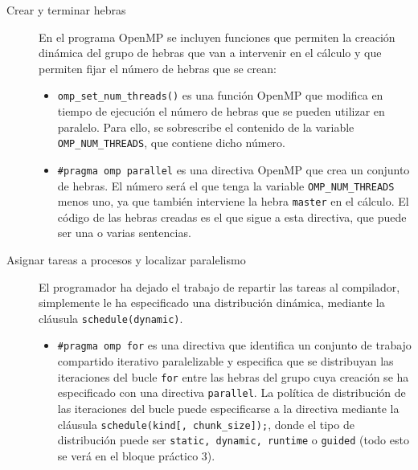 \begin{description}
    \item [Crear y terminar hebras] En el programa OpenMP se incluyen funciones que permiten la creación dinámica del grupo de hebras que van a intervenir en el cálculo y que permiten fijar el número de hebras que se crean:
        \begin{itemize}
            \item \verb|omp_set_num_threads()| es una función OpenMP que modifica en tiempo de ejecución el número de hebras que se pueden utilizar en paralelo. Para ello, se sobrescribe el contenido de la variable \verb|OMP_NUM_THREADS|, que contiene dicho número.
            \item \verb|#pragma omp parallel| es una directiva OpenMP que crea un conjunto de hebras. El número será el que tenga la variable \verb|OMP_NUM_THREADS| menos uno, ya que también interviene la hebra \verb|master| en el cálculo. El código de las hebras creadas es el que sigue a esta directiva, que puede ser una o varias sentencias.
        \end{itemize}
    \item [Asignar tareas a procesos y localizar paralelismo] El programador ha dejado el trabajo de repartir las tareas al compilador, simplemente le ha especificado una distribución dinámica, mediante la cláusula \verb|schedule(dynamic)|.
        \begin{itemize}
            \item \verb|#pragma omp for| es una directiva que identifica un conjunto de trabajo compartido iterativo paralelizable y especifica que se distribuyan las iteraciones del bucle \verb|for| entre las hebras del grupo cuya creación se ha especificado con una directiva \verb|parallel|. La política de distribución de las iteraciones del bucle puede especificarse a la directiva mediante la cláusula \verb|schedule(kind[, chunk_size]);|, donde el tipo de distribución puede ser \verb|static, dynamic, runtime| o \verb|guided| (todo esto se verá en el bloque práctico 3).


\end{itemize}
\end{description}
